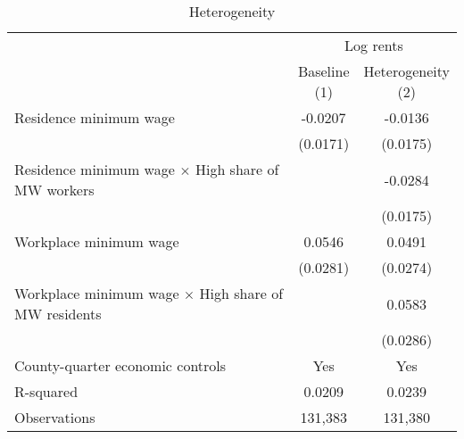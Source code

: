 \begin{table}[hbt!] \centering
    \caption{Heterogeneity}
    \label{tab:heterogeneity}
    \begin{tabular}{@{}lcc@{}}
        \toprule
            & \multicolumn{2}{c}{Log rents}                                         \\ \cmidrule(l){2-3} 
            & \shortstack{Baseline \\(1)} 
            & \shortstack{Heterogeneity \\(2)}                                      \\ \midrule
        Residence minimum wage                                     &  -0.0207   &  -0.0136  \\
                                                                   & (0.0171)  & (0.0175) \\
        Residence minimum wage $\times$ High share of MW workers   &        &  -0.0284  \\
                                                                   &        & (0.0175) \\        
        Workplace minimum wage                                     &  0.0546   &  0.0491  \\
                                                                   & (0.0281)  & (0.0274) \\
        Workplace minimum wage $\times$ High share of MW residents &        &  0.0583  \\
                                                                   &        & (0.0286) \\
        County-quarter economic controls                           &  Yes   &  Yes  \\
        R-squared                                                  &  0.0209   &  0.0239  \\
        Observations                                               &  131,383  &  131,380 \\ \bottomrule
    \end{tabular}


\end{table}
